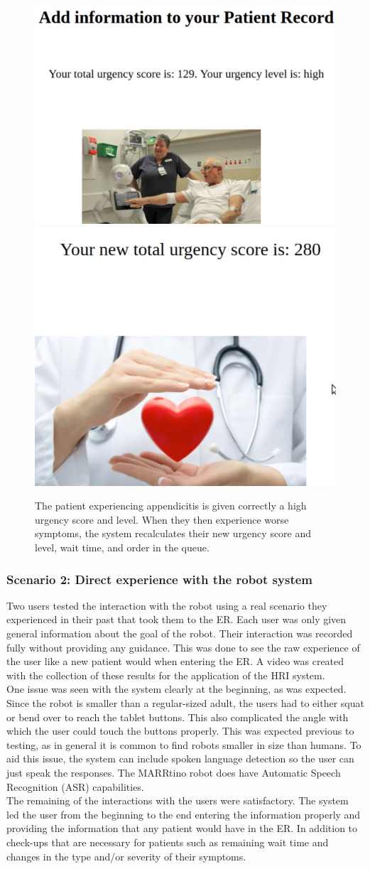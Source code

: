 \documentclass[letterpaper]{article}
\begin{document}
\begin{figure}[H]
  \centering
  \includegraphics[width=.25\textwidth]{RecordUrgencyScore.png}\hfill
  \includegraphics[width=.2\textwidth]{NewUrgencyScore.png}\hfill 
   \caption{The patient experiencing appendicitis is given correctly a high urgency score and level. When they then experience worse symptoms, the system recalculates their new urgency score and level, wait time, and order in the queue.}
\end{figure}

\subsubsection{Scenario 2: Direct experience with the robot system}
Two users tested the interaction with the robot using a real scenario they experienced in their past that took them to the ER. Each user was only given general information about the goal of the robot. Their interaction was recorded fully without providing any guidance. This was done to see the raw experience of the user like a new patient would when entering the ER. A video was created with the collection of these results for the application of the HRI system. \\

One issue was seen with the system clearly at the beginning, as was expected. Since the robot is smaller than a regular-sized adult, the users had to either squat or bend over to reach the tablet buttons. This also complicated the angle with which the user could touch the buttons properly. This was expected previous to testing, as in general it is common to find robots smaller in size than humans. To aid this issue, the system can include spoken language detection so the user can just speak the responses. The MARRtino robot does have Automatic Speech Recognition (ASR) capabilities. \\

The remaining of the interactions with the users were satisfactory. The system led the user from the beginning to the end entering the information properly and providing the information that any patient would have in the ER. In addition to check-ups that are necessary for patients such as remaining wait time and changes in the type and/or severity of their symptoms. \\
\end{document}
